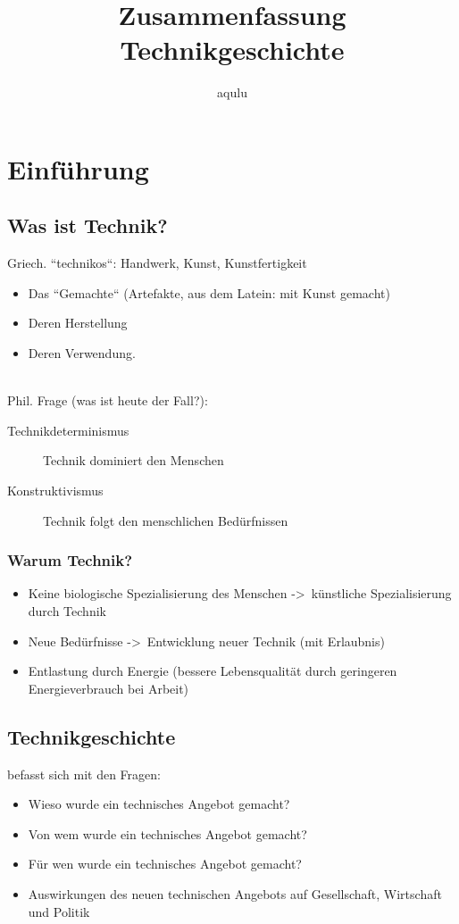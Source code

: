 \documentclass{report}
\begin{document}
\newcommand{\arrow}{-\textgreater}

\title{Zusammenfassung Technikgeschichte}
\author{aqulu}
\maketitle
\tableofcontents
\newpage

\chapter{Einführung}

\section{Was ist Technik?}
Griech. ``technikos``: Handwerk, Kunst, Kunstfertigkeit\\
\begin{itemize}
	\item Das ``Gemachte`` (Artefakte, aus dem Latein: mit Kunst gemacht)
	\item Deren Herstellung
	\item Deren Verwendung. 
\end{itemize}~\\
Phil. Frage (was ist heute der Fall?): 
\begin{description}
	\item[Technikdeterminismus] Technik dominiert den Menschen
	\item[Konstruktivismus] Technik folgt den menschlichen Bedürfnissen
\end{description}

\subsection{Warum Technik?}
\begin{itemize}
	\item Keine biologische Spezialisierung des Menschen -\textgreater~künstliche Spezialisierung durch Technik
	\item Neue Bedürfnisse -\textgreater~Entwicklung neuer Technik (mit Erlaubnis)
	\item Entlastung durch Energie (bessere Lebensqualität durch geringeren Energieverbrauch bei Arbeit)
\end{itemize}

\newpage

\section{Technikgeschichte}
befasst sich mit den Fragen:
\begin{itemize}
	\item Wieso wurde ein technisches Angebot gemacht?
	\item Von wem wurde ein technisches Angebot gemacht?
	\item Für wen wurde ein technisches Angebot gemacht?
	\item Auswirkungen des neuen technischen Angebots auf Gesellschaft, Wirtschaft und Politik
\end{itemize}
\end{document}
